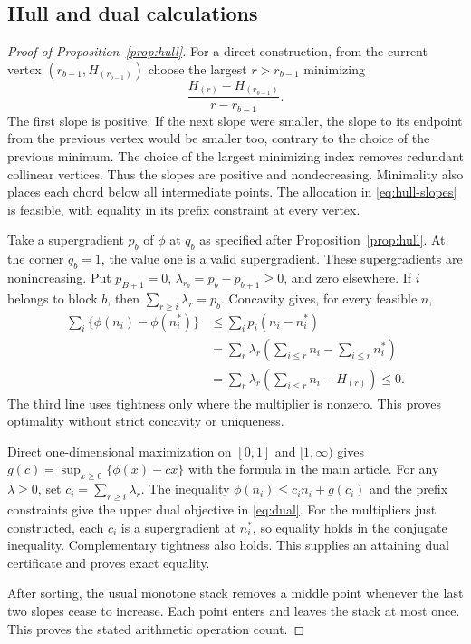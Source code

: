\subsection{Hull and dual calculations}
\begin{proof}[Proof of Proposition~\ref{prop:hull}]
For a direct construction, from the current vertex $(r_{b-1},H_{(r_{b-1})})$ choose the largest $r>r_{b-1}$ minimizing
\[
 \frac{H_{(r)}-H_{(r_{b-1})}}{r-r_{b-1}}.
\]
The first slope is positive. If the next slope were smaller, the slope to its endpoint from the previous vertex would be smaller too, contrary to the choice of the previous minimum. The choice of the largest minimizing index removes redundant collinear vertices. Thus the slopes are positive and nondecreasing. Minimality also places each chord below all intermediate points. The allocation in \eqref{eq:hull-slopes} is feasible, with equality in its prefix constraint at every vertex.

Take a supergradient $p_b$ of $\phi$ at $q_b$ as specified after Proposition~\ref{prop:hull}. At the corner $q_b=1$, the value one is a valid supergradient. These supergradients are nonincreasing. Put $p_{B+1}=0$, $\lambda_{r_b}=p_b-p_{b+1}\ge0$, and zero elsewhere. If $i$ belongs to block $b$, then $\sum_{r\ge i}\lambda_r=p_b$. Concavity gives, for every feasible $n$,
\begin{align*}
 \sum_i\{\phi(n_i)-\phi(n_i^*)\}
 &\le\sum_i p_i(n_i-n_i^*)\\
 &=\sum_r\lambda_r\left(\sum_{i\le r}n_i-\sum_{i\le r}n_i^*\right)\\
 &=\sum_r\lambda_r\left(\sum_{i\le r}n_i-H_{(r)}\right)\le0.
\end{align*}
The third line uses tightness only where the multiplier is nonzero. This proves optimality without strict concavity or uniqueness.

Direct one-dimensional maximization on $[0,1]$ and $[1,\infty)$ gives $g(c)=\sup_{x\ge0}\{\phi(x)-cx\}$ with the formula in the main article. For any $\lambda\ge0$, set $c_i=\sum_{r\ge i}\lambda_r$. The inequality $\phi(n_i)\le c_in_i+g(c_i)$ and the prefix constraints give the upper dual objective in \eqref{eq:dual}. For the multipliers just constructed, each $c_i$ is a supergradient at $n_i^*$, so equality holds in the conjugate inequality. Complementary tightness also holds. This supplies an attaining dual certificate and proves exact equality.

After sorting, the usual monotone stack removes a middle point whenever the last two slopes cease to increase. Each point enters and leaves the stack at most once. This proves the stated arithmetic operation count.
\end{proof}

